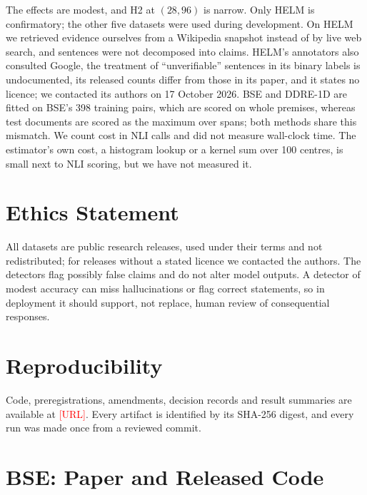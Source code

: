 \documentclass[11pt]{article}
\newcommand{\pending}[1]{\textcolor{red}{[#1]}}
\begin{document}
The effects are modest, and H2 at $(28, 96)$ is narrow. Only HELM is
confirmatory; the other five datasets were used during development. On HELM we
retrieved evidence ourselves from a Wikipedia snapshot instead of by live web
search, and sentences were not decomposed into claims. HELM's annotators also
consulted Google, the treatment of ``unverifiable'' sentences in its binary
labels is undocumented, its released counts differ from those in its paper,
and it states no licence; we contacted its authors on 17 October 2026. BSE and
DDRE-1D are fitted on BSE's 398 training pairs, which are scored on whole
premises, whereas test documents are scored as the maximum over spans; both
methods share this mismatch. We count cost in NLI calls and did not measure
wall-clock time. The estimator's own cost, a histogram lookup or a kernel sum
over 100 centres, is small next to NLI scoring, but we have not measured it.

\section*{Ethics Statement}

All datasets are public research releases, used under their terms and not
redistributed; for releases without a stated licence we contacted the authors.
The detectors flag possibly false claims and do not alter model outputs. A
detector of modest accuracy can miss hallucinations or flag correct
statements, so in deployment it should support, not replace, human review of
consequential responses.

\section*{Reproducibility}

Code, preregistrations, amendments, decision records and result summaries are
available at \pending{URL}. Every artifact is identified by its SHA-256 digest,
and every run was made once from a reviewed commit.



\appendix

\section{BSE: Paper and Released Code}
\label{app:deviations}
\end{document}
